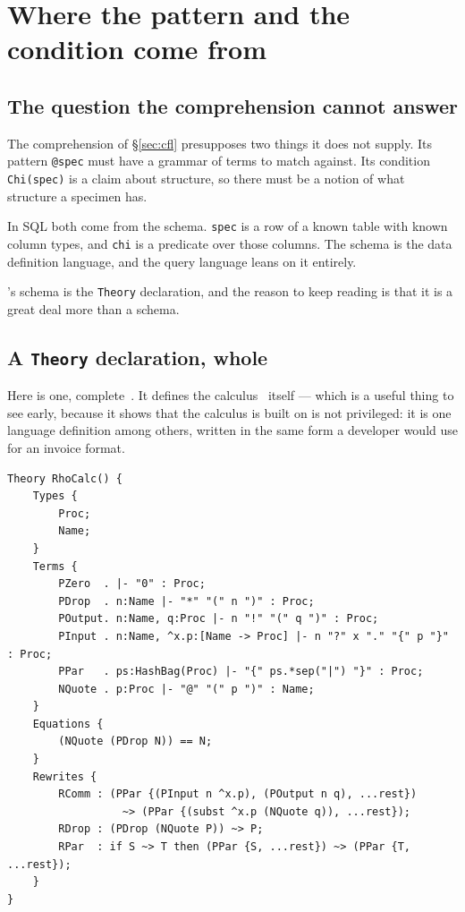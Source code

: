 \section{Where the pattern and the condition come from}
\label{sec:ddl}

\subsection{The question the comprehension cannot answer}

The comprehension of \S\ref{sec:cfl} presupposes two things it does not supply.
Its pattern \texttt{@spec} must have a grammar of terms to match against. Its condition \texttt{Chi(spec)} is a claim about
structure, so there must be a notion of what structure a specimen has.

In SQL both come from the schema. \texttt{spec} is a row of a known table with
known column types, and \texttt{chi} is a predicate over those columns. The
schema is the data definition language, and the query language leans on it
entirely.

\flang{}'s schema is the \texttt{Theory} declaration, and the reason to keep
reading is that it is a great deal more than a schema.

\subsection{A \texttt{Theory} declaration, whole}

Here is one, complete~\cite{modulesyntax}. It defines the \rhoc{}
calculus~\cite{MR05} itself --- which is a
useful thing to see early, because it shows that the calculus \flang{} is built
on is not privileged: it is one language definition among others, written in
the same form a developer would use for an invoice format.

\begin{lstlisting}[language=mettail]
Theory RhoCalc() {
    Types {
        Proc;
        Name;
    }
    Terms {
        PZero  . |- "0" : Proc;
        PDrop  . n:Name |- "*" "(" n ")" : Proc;
        POutput. n:Name, q:Proc |- n "!" "(" q ")" : Proc;
        PInput . n:Name, ^x.p:[Name -> Proc] |- n "?" x "." "{" p "}" : Proc;
        PPar   . ps:HashBag(Proc) |- "{" ps.*sep("|") "}" : Proc;
        NQuote . p:Proc |- "@" "(" p ")" : Name;
    }
    Equations {
        (NQuote (PDrop N)) == N;
    }
    Rewrites {
        RComm : (PPar {(PInput n ^x.p), (POutput n q), ...rest})
                  ~> (PPar {(subst ^x.p (NQuote q)), ...rest});
        RDrop : (PDrop (NQuote P)) ~> P;
        RPar  : if S ~> T then (PPar {S, ...rest}) ~> (PPar {T, ...rest});
    }
}
\end{lstlisting}

